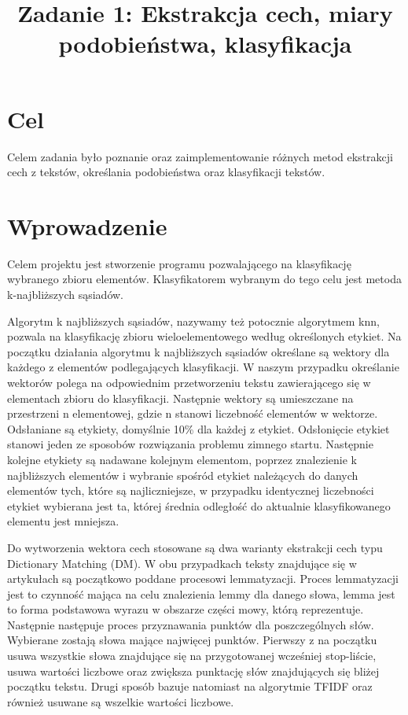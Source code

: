 \documentclass{classrep}
\author{
  \studentinfo{Stanisław Zakrzewski}{210360} \and
  \studentinfo{ Maciej Socha}{210321}
}
\title{Zadanie 1: Ekstrakcja cech, miary podobieństwa, klasyfikacja}
\begin{document}
\maketitle
\newpage

\section{Cel}
Celem zadania było poznanie oraz zaimplementowanie różnych metod ekstrakcji cech z tekstów, określania podobieństwa oraz klasyfikacji tekstów.

\section{Wprowadzenie}
	Celem projektu jest stworzenie programu pozwalającego na klasyfikację  wybranego zbioru elementów. Klasyfikatorem wybranym do tego celu jest metoda k-najbliższych sąsiadów.
	
	Algorytm k najbliższych sąsiadów, nazywamy też potocznie algorytmem knn, pozwala na klasyfikację zbioru wieloelementowego według określonych etykiet. Na początku działania algorytmu k najbliższych sąsiadów określane są wektory dla każdego z elementów podlegających klasyfikacji. W naszym przypadku określanie wektorów polega na odpowiednim przetworzeniu tekstu zawierającego się w elementach zbioru do klasyfikacji. Następnie wektory są umieszczane na przestrzeni n elementowej, gdzie n stanowi liczebność elementów w wektorze. Odsłaniane są etykiety, domyślnie 10\% dla każdej z etykiet. Odsłonięcie etykiet stanowi jeden ze sposobów rozwiązania problemu zimnego startu. Następnie kolejne etykiety są nadawane kolejnym elementom, poprzez znalezienie k najbliższych elementów i wybranie spośród etykiet należących do danych elementów tych, które są najliczniejsze, w przypadku identycznej liczebności etykiet wybierana jest ta, której średnia odległość do aktualnie klasyfikowanego elementu jest mniejsza.
	
	Do wytworzenia wektora cech stosowane są dwa warianty ekstrakcji cech typu Dictionary Matching (DM). W obu przypadkach teksty znajdujące się w artykułach są początkowo poddane procesowi lemmatyzacji. Proces lemmatyzacji jest to czynność mająca na celu znalezienia lemmy dla danego słowa, lemma jest to forma podstawowa wyrazu w obszarze części mowy, którą reprezentuje. Następnie następuje proces przyznawania punktów dla poszczególnych słów. Wybierane zostają słowa mające najwięcej punktów. Pierwszy z na początku usuwa wszystkie słowa znajdujące się na przygotowanej wcześniej stop-liście, usuwa wartości liczbowe oraz zwiększa punktację słów znajdujących się bliżej początku tekstu. Drugi sposób bazuje natomiast na algorytmie TFIDF oraz również usuwane są wszelkie wartości liczbowe. 
	
\end{document}
